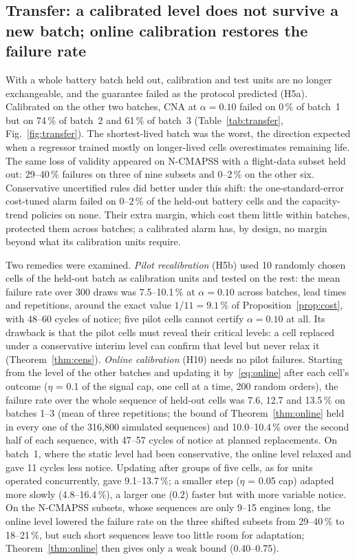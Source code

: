 \subsection{Transfer: a calibrated level does not survive a new batch; online calibration restores the failure rate}\label{sec:res-transfer}

With a whole battery batch held out, calibration and test units are no longer exchangeable, and the guarantee failed as the protocol predicted (H5a). Calibrated on the other two batches, CNA at $\alpha=0.10$ failed on 0\,\% of batch~1 but on 74\,\% of batch~2 and 61\,\% of batch~3 (Table~\ref{tab:transfer}, Fig.~\ref{fig:transfer}). The shortest-lived batch was the worst, the direction expected when a regressor trained mostly on longer-lived cells overestimates remaining life. The same loss of validity appeared on N-CMAPSS with a flight-data subset held out: 29--40\,\% failures on three of nine subsets and 0--2\,\% on the other six. Conservative uncertified rules did better under this shift: the one-standard-error cost-tuned alarm failed on 0--2\,\% of the held-out battery cells and the capacity-trend policies on none. Their extra margin, which cost them little within batches, protected them across batches; a calibrated alarm has, by design, no margin beyond what its calibration units require.

Two remedies were examined. \emph{Pilot recalibration} (H5b) used 10 randomly chosen cells of the held-out batch as calibration units and tested on the rest: the mean failure rate over 300 draws was 7.5--10.1\,\% at $\alpha=0.10$ across batches, lead times and repetitions, around the exact value $1/11=9.1\,\%$ of Proposition~\ref{prop:cost}, with 48--60 cycles of notice; five pilot cells cannot certify $\alpha=0.10$ at all. Its drawback is that the pilot cells must reveal their critical levels: a cell replaced under a conservative interim level can confirm that level but never relax it (Theorem~\ref{thm:cens}). \emph{Online calibration} (H10) needs no pilot failures. Starting from the level of the other batches and updating it by~\eqref{eq:online} after each cell's outcome ($\eta$ = 0.1 of the signal cap, one cell at a time, 200 random orders), the failure rate over the whole sequence of held-out cells was 7.6, 12.7 and 13.5\,\% on batches 1--3 (mean of three repetitions; the bound of Theorem~\ref{thm:online} held in every one of the 316,800 simulated sequences) and 10.0--10.4\,\% over the second half of each sequence, with 47--57 cycles of notice at planned replacements. On batch~1, where the static level had been conservative, the online level relaxed and gave 11 cycles less notice. Updating after groups of five cells, as for units operated concurrently, gave 9.1--13.7\,\%; a smaller step ($\eta$ = 0.05 cap) adapted more slowly (4.8--16.4\,\%), a larger one ($0.2$) faster but with more variable notice. On the N-CMAPSS subsets, whose sequences are only 9--15 engines long, the online level lowered the failure rate on the three shifted subsets from 29--40\,\% to 18--21\,\%, but such short sequences leave too little room for adaptation; Theorem~\ref{thm:online} then gives only a weak bound (0.40--0.75).

